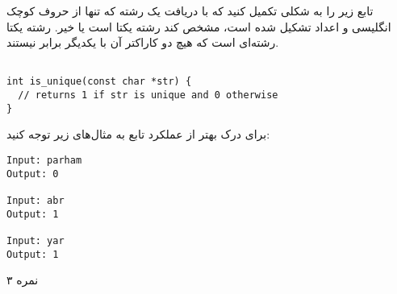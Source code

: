 
تابع زیر را به شکلی تکمیل کنید که با دریافت یک رشته که تنها از حروف کوچک انگلیسی و اعداد تشکیل شده است، مشخص کند رشته یکتا است یا خیر. رشته یکتا رشته‌ای است که هیچ دو کاراکتر آن با یکدیگر برابر نیستند.

\begin{latin}
\begin{verbatim}

int is_unique(const char *str) {
  // returns 1 if str is unique and 0 otherwise
}

\end{verbatim}
\end{latin}

برای درک بهتر از عملکرد تابع به مثال‌های زیر توجه کنید:

\begin{latin}

\begin{verbatim}
Input: parham
Output: 0

Input: abr
Output: 1

Input: yar
Output: 1
\end{verbatim}
\end{latin}

۳ نمره
